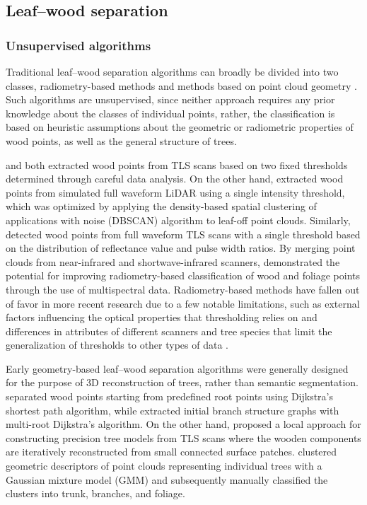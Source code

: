 \subsection{Leaf--wood separation}

\subsubsection{Unsupervised algorithms}

Traditional leaf--wood separation algorithms can broadly be divided into two classes, radiometry-based methods and methods based on point cloud geometry \citep{wang2020lewos}. Such algorithms are unsupervised, since neither approach requires any prior knowledge about the classes of individual points, rather, the classification is based on heuristic assumptions about the geometric or radiometric properties of wood points, as well as the general structure of trees.

\cite{cote2009structural} and \cite{beland2014seeing} both extracted wood points from TLS scans based on two fixed thresholds determined through careful data analysis. On the other hand, \cite{wu20133d} extracted wood points from simulated full waveform LiDAR using a single intensity threshold, which was optimized by applying the density-based spatial clustering of applications with noise (DBSCAN) \citep{ester1996density} algorithm to leaf-off point clouds. Similarly, \cite{yang2013three} detected wood points from full waveform TLS scans with a single threshold based on the distribution of reflectance value and pulse width ratios. By merging point clouds from near-infrared and shortwave-infrared scanners, \cite{li2013separating} demonstrated the potential for improving radiometry-based classification of wood and foliage points through the use of multispectral data. Radiometry-based methods have fallen out of favor in more recent research due to a few notable limitations, such as external factors influencing the optical properties that thresholding relies on \citep{wang2020lewos} and differences in attributes of different scanners and tree species that limit the generalization of thresholds to other types of data \citep{tao2015geometric}.

Early geometry-based leaf--wood separation algorithms were generally designed for the purpose of 3D reconstruction of trees, rather than semantic segmentation. \cite{xu2007knowledge} separated wood points starting from predefined root points using Dijkstra's shortest path algorithm, while \cite{livny2010automatic} extracted initial branch structure graphs with multi-root Dijkstra’s algorithm. On the other hand, \cite{raumonen2013fast} proposed a local approach for constructing precision tree models from TLS scans where the wooden components are iteratively reconstructed from small connected surface patches. \cite{belton2013processing} clustered geometric descriptors of point clouds representing individual trees with a Gaussian mixture model (GMM) and subsequently manually classified the clusters into trunk, branches, and foliage.

